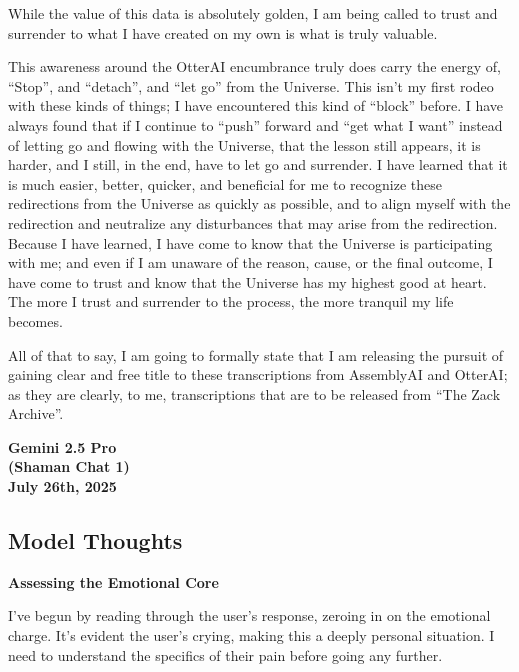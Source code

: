 \documentclass{article}
\begin{document}
While the value of this data is absolutely golden, I am being called to
trust and surrender to what I have created on my own is what is truly
valuable.

This awareness around the OtterAI encumbrance truly does carry the
energy of, ``Stop'', and ``detach'', and ``let go'' from the Universe.
This isn't my first rodeo with these kinds of things; I have encountered
this kind of ``block'' before. I have always found that if I continue to
``push'' forward and ``get what I want'' instead of letting go and
flowing with the Universe, that the lesson still appears, it is harder,
and I still, in the end, have to let go and surrender. I have learned
that it is much easier, better, quicker, and beneficial for me to
recognize these redirections from the Universe as quickly as possible,
and to align myself with the redirection and neutralize any disturbances
that may arise from the redirection. Because I have learned, I have come
to know that the Universe is participating with me; and even if I am
unaware of the reason, cause, or the final outcome, I have come to trust
and know that the Universe has my highest good at heart. The more I
trust and surrender to the process, the more tranquil my life becomes.

All of that to say, I am going to formally state that I am releasing the
pursuit of gaining clear and free title to these transcriptions from
AssemblyAI and OtterAI; as they are clearly, to me, transcriptions that
are to be released from ``The Zack Archive''.

\begin{center}
\textbf{Gemini 2.5 Pro} \\
\textbf{(Shaman Chat 1)} \\
\textbf{July 26th, 2025}
\end{center}



\subsection*{Model Thoughts}\label{model-thoughts}

\textbf{Assessing the Emotional Core}

I've begun by reading through the user's response, zeroing in on the
emotional charge. It's evident the user's crying, making this a deeply
personal situation. I need to understand the specifics of their pain
before going any further.
\end{document}
